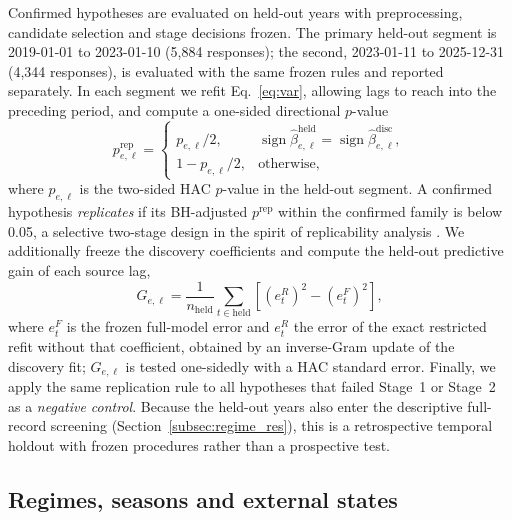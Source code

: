 \documentclass[preprint,12pt]{elsarticle}
\begin{document}
Confirmed hypotheses are evaluated on held-out years with preprocessing, candidate selection and stage decisions frozen. The primary held-out segment is 2019-01-01 to 2023-01-10 (5,884 responses); the second, 2023-01-11 to 2025-12-31 (4,344 responses), is evaluated with the same frozen rules and reported separately. In each segment we refit Eq.~\eqref{eq:var}, allowing lags to reach into the preceding period, and compute a one-sided directional $p$-value
\begin{equation}
p^{\mathrm{rep}}_{e,\ell}=\begin{cases}p_{e,\ell}/2,&\operatorname{sign}\widehat{\beta}^{\mathrm{held}}_{e,\ell}=\operatorname{sign}\widehat{\beta}^{\mathrm{disc}}_{e,\ell},\\1-p_{e,\ell}/2,&\text{otherwise},\end{cases}
\end{equation}
where $p_{e,\ell}$ is the two-sided HAC $p$-value in the held-out segment. A confirmed hypothesis \emph{replicates} if its BH-adjusted $p^{\mathrm{rep}}$ within the confirmed family is below 0.05, a selective two-stage design in the spirit of replicability analysis \citep{Bogomolov2023Replicability}. We additionally freeze the discovery coefficients and compute the held-out predictive gain of each source lag,
\begin{equation}
G_{e,\ell}=\frac{1}{n_{\mathrm{held}}}\sum_{t\in\mathrm{held}}\left[\left(e^{R}_{t}\right)^{2}-\left(e^{F}_{t}\right)^{2}\right],
\end{equation}
where $e^{F}_t$ is the frozen full-model error and $e^{R}_t$ the error of the exact restricted refit without that coefficient, obtained by an inverse-Gram update of the discovery fit; $G_{e,\ell}$ is tested one-sidedly with a HAC standard error. Finally, we apply the same replication rule to all hypotheses that failed Stage~1 or Stage~2 as a \emph{negative control}. Because the held-out years also enter the descriptive full-record screening (Section~\ref{subsec:regime_res}), this is a retrospective temporal holdout with frozen procedures rather than a prospective test.

\subsection{Regimes, seasons and external states}
\label{subsec:regimes}
\end{document}
